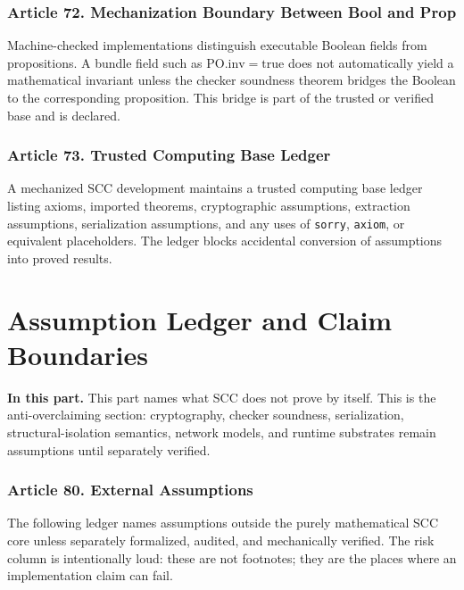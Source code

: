 \documentclass[10pt,oneside]{article}
\theoremstyle{definition}
\theoremstyle{remark}
\newcommand{\PO}{\mathrm{PO}}
\newcommand{\inv}{\mathrm{inv}}
\newcommand{\PartIntro}[1]{\noindent\textbf{In this part.} #1\par\medskip}
\begin{document}
\section{Article 72. Mechanization Boundary Between Bool and Prop}
Machine-checked implementations distinguish executable Boolean fields from propositions. A bundle field such as \(\PO.\inv=\mathrm{true}\) does not automatically yield a mathematical invariant unless the checker soundness theorem bridges the Boolean to the corresponding proposition. This bridge is part of the trusted or verified base and is declared.

\section{Article 73. Trusted Computing Base Ledger}
A mechanized SCC development maintains a trusted computing base ledger listing axioms, imported theorems, cryptographic assumptions, extraction assumptions, serialization assumptions, and any uses of \texttt{sorry}, \texttt{axiom}, or equivalent placeholders. The ledger blocks accidental conversion of assumptions into proved results.

\part{Assumption Ledger and Claim Boundaries}

\PartIntro{This part names what SCC does not prove by itself. This is the anti-overclaiming section: cryptography, checker soundness, serialization, structural-isolation semantics, network models, and runtime substrates remain assumptions until separately verified.}


\section{Article 80. External Assumptions}
The following ledger names assumptions outside the purely mathematical SCC core unless separately formalized, audited, and mechanically verified. The risk column is intentionally loud: these are not footnotes; they are the places where an implementation claim can fail.
\end{document}
